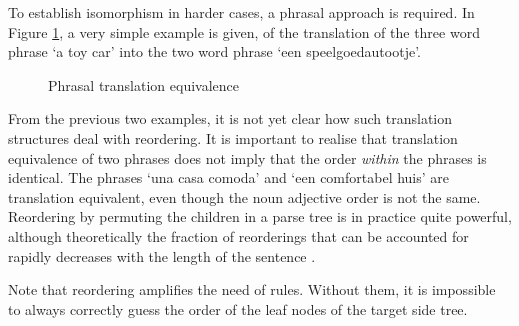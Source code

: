 \documentclass{report}
\theoremstyle{definition}
\theoremstyle{plain}
\begin{document}
To establish isomorphism in harder cases, a phrasal approach is required. In Figure \ref{fig:phrasal}, a very simple example is given, of the translation of the three word phrase `a toy car' into the two word phrase `een speelgoedautootje'.

\begin{figure}[!ht]
\centering
{}
\caption{Phrasal translation equivalence}\label{fig:phrasal}
\end{figure}

From the previous two examples, it is not yet clear how such translation structures deal with reordering. It is important to realise that translation equivalence of two phrases does not imply that the order \textit{within} the phrases is identical. The phrases `una casa comoda' and `een comfortabel huis' are translation equivalent, even though the noun adjective order is not the same. Reordering by permuting the children in a parse tree is in practice quite powerful, although theoretically the fraction of reorderings that can be accounted for rapidly decreases with the length of the sentence \citep{satta2005some}.

Note that reordering amplifies the need of rules. Without them, it is impossible to always correctly guess the order of the leaf nodes of the target side tree.
\end{document}
